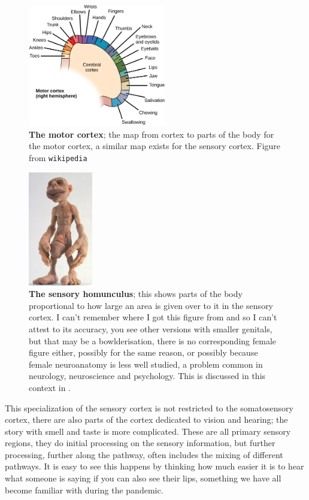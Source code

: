 \documentclass[12pt]{article}
\begin{document}
\begin{figure}[tbhp]
  \begin{center}
  \includegraphics[width=6cm]{motor_mapping.jpg}
\end{center}
  \caption{\textbf{The motor cortex}; the map from cortex to parts of the body for the motor cortex, a similar map exists for the sensory cortex. Figure from
    \texttt{wikipedia}\label{fig_motor}}
\end{figure}


\begin{figure}[tbhp]
  \begin{center}
  \includegraphics[height=5cm]{sensory.jpg}
\end{center}
  \caption{\textbf{The sensory homunculus}; this shows parts of the
    body proportional to how large an area is given over to it in the
    sensory cortex. I can't remember where I got this figure from and
    so I can't attest to its accuracy, you see other versions with
    smaller genitals, but that may be a bowlderisation, there is no
    corresponding female figure either, possibly for the same reason,
    or possibly because female neuroanatomy is less well studied, a
    problem common in neurology, neuroscience and psychology. This is
    discussed in this context in
    \cite{WrightFoerder2020}.\label{fig_motor}}
\end{figure}

This specialization of the sensory cortex is not restricted to the
somatosensory cortex, there are also parts of the cortex dedicated to
vision and hearing; the story with smell and taste is more
complicated. These are all primary sensory regions, they do initial
processing on the sensory information, but further processing, further
along the pathway, often includes the mixing of different pathways. It
is easy to see this happens by thinking how much easier it is to hear
what someone is saying if you can also see their lips, something we
have all become familiar with during the pandemic.
\end{document}
